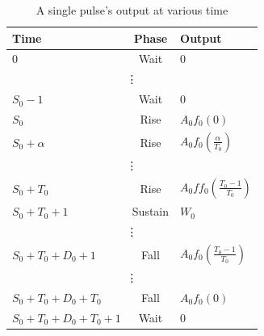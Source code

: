\begin{table}[ht]
    \centering
    \caption{A single pulse's output at various time}
    \begin{tabularx}{\textwidth}{|X|c|X|}
        \hline
        Time & Phase & Output \\
        \hline
        0&Wait&0\\
        \hline
        \multicolumn{3}{|c|}{\vdots}\\
        \hline
        $S_0-1$&Wait&0\\
        \hline
        $S_0$&Rise&$A_0f_0(0)$\\
        \hline
        $S_0+\alpha$&Rise&$A_0f_0(\frac{\alpha}{T_0})$\\
        \hline
        \multicolumn{3}{|c|}{\vdots}\\
        \hline
        $S_0+T_0$&Rise&$A_0ff_0(\frac{T_0-1}{T_0})$\\
        \hline
        $S_0+T_0+1$&Sustain&$W_0$\\
        \hline
        \multicolumn{3}{|c|}{\vdots}\\
        \hline
        $S_0+T_0+D_0+1$&Fall&$A_0f_0(\frac{T_0-1}{T_0})$\\
        \hline
        \multicolumn{3}{|c|}{\vdots}\\
        \hline
        $S_0+T_0+D_0+T_0$&Fall&$A_0f_0(0)$\\
        \hline
        $S_0+T_0+D_0+T_0+1$&Wait&$0$\\
        \hline
    \end{tabularx}
    \label{tab:pulse_eqs}
\end{table}



